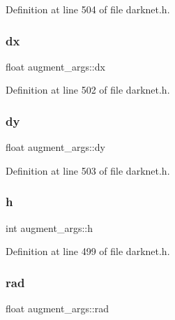 Definition at line 504 of file darknet.\+h.

\mbox{\label{structaugment__args_a74675af1ca9ba9cfc2f97da65fad1ff7}} 
\subsubsection{\texorpdfstring{dx}{dx}}
{\footnotesize\ttfamily float augment\+\_\+args\+::dx}



Definition at line 502 of file darknet.\+h.

\mbox{\label{structaugment__args_aee2e7812e750cd312082426e3a2fc7a2}} 
\subsubsection{\texorpdfstring{dy}{dy}}
{\footnotesize\ttfamily float augment\+\_\+args\+::dy}



Definition at line 503 of file darknet.\+h.

\mbox{\label{structaugment__args_afb11ad51cc544deb41ef00c118869612}} 
\subsubsection{\texorpdfstring{h}{h}}
{\footnotesize\ttfamily int augment\+\_\+args\+::h}



Definition at line 499 of file darknet.\+h.

\mbox{\label{structaugment__args_ad40390f9fe68f5079f95789b6673b2e9}} 
\subsubsection{\texorpdfstring{rad}{rad}}
{\footnotesize\ttfamily float augment\+\_\+args\+::rad}



